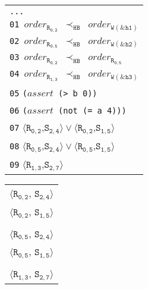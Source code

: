 \newsavebox{\boxSMTc}
\begin{lrbox}{\boxSMTc}
\normalsize
\begin{tabular}[t]{l}
\texttt{...} \\
\texttt{01 $\mathit{order_\mathtt{R_{0,2}}}$ $\mathtt{\prec_\mathtt{HB}}$ $\mathit{order_\mathtt{W(\&h1)}}$}\\
\texttt{02 $\mathit{order_\mathtt{R_{0,5}}}$ $\mathtt{\prec_\mathtt{HB}}$ $\mathit{order_\mathtt{W(\&h2)}}$}\\
\texttt{03 $\mathit{order_\mathtt{R_{0,2}}}$ $\mathtt{\prec_\mathtt{HB}}$ $\mathit{order_\mathtt{R_{0,5}}}$}\\
\texttt{04 $\mathit{order_\mathtt{R_{1,3}}}$ $\mathtt{\prec_\mathtt{HB}}$ $\mathit{order_\mathtt{W(\&h3)}}$}\\
\texttt{05} \texttt{($\mathit{assert}$ (> b 0))}\\
\texttt{06} \texttt{($\mathit{assert}$ (not (= a 4)))}\\
\texttt{07} $\langle\mathtt{R_{0,2}}$,$\mathtt{S_{2,4}}\rangle\vee\langle\mathtt{R_{0,2}}$,$\mathtt{S_{1,5}}\rangle$\\
\texttt{08} $\langle\mathtt{R_{0,5}}$,$\mathtt{S_{2,4}}\rangle\vee\langle\mathtt{R_{0,5}}$,$\mathtt{S_{1,5}}\rangle$\\
\texttt{09} $\langle\mathtt{R_{1,3}}$,$\mathtt{S_{2,7}}\rangle$
\end{tabular}
\end{lrbox}

\newsavebox{\boxMP}
\begin{lrbox}{\boxMP}
\normalsize
\begin{tabular}[t]{l}
$\langle\mathtt{R_{0,2}}$, $\mathtt{S_{2,4}}\rangle$\\
$\langle\mathtt{R_{0,2}}$, $\mathtt{S_{1,5}}\rangle$\\
\\
$\langle\mathtt{R_{0,5}}$, $\mathtt{S_{2,4}}\rangle$\\
$\langle\mathtt{R_{0,5}}$, $\mathtt{S_{1,5}}\rangle$\\
\\
$\langle\mathtt{R_{1,3}}$, $\mathtt{S_{2,7}}\rangle$\\
\end{tabular}
\end{lrbox}


